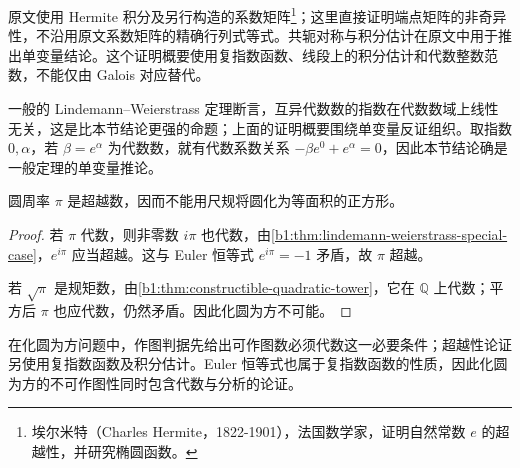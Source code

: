 \begin{proofsketch}
	原文\cite[\S 1, pp. 214--216]{Lindemann1882Pi}使用 Hermite 积分及另行构造的系数矩阵\footnote{埃尔米特（Charles Hermite，1822-1901），法国数学家，证明自然常数 \(e\) 的超越性，并研究椭圆函数。}；这里直接证明端点矩阵的非奇异性，不沿用原文系数矩阵的精确行列式等式。共轭对称与积分估计在原文\cite[\S\S 2--4, pp. 216--225]{Lindemann1882Pi}中用于推出单变量结论。这个证明概要使用复指数函数、线段上的积分估计和代数整数范数，不能仅由 Galois 对应替代。
\end{proofsketch}

一般的 Lindemann--Weierstrass 定理断言，互异代数数的指数在代数数域上线性无关，这是比本节结论更强的命题；上面的证明概要围绕单变量反证组织。取指数 \(0,\alpha\)，若 \(\beta=e^\alpha\) 为代数数，就有代数系数关系 \(-\beta e^0+e^\alpha=0\)，因此本节结论确是一般定理的单变量推论。

\begin{corollary}\label{b1:cor:pi-transcendental}
	圆周率 \(\pi\) 是超越数，因而不能用尺规将圆化为等面积的正方形。
\end{corollary}
\begin{proof}
	若 \(\pi\) 代数，则非零数 \(i\pi\) 也代数，由\cref{b1:thm:lindemann-weierstrass-special-case}，\(e^{i\pi}\) 应当超越。这与 Euler 恒等式 \(e^{i\pi}=-1\) 矛盾，故 \(\pi\) 超越。

	若 \(\sqrt\pi\) 是规矩数，由\cref{b1:thm:constructible-quadratic-tower}，它在 \(\mathbb Q\) 上代数；平方后 \(\pi\) 也应代数，仍然矛盾。因此化圆为方不可能。
\end{proof}
在化圆为方问题中，作图判据先给出可作图数必须代数这一必要条件；超越性论证另使用复指数函数及积分估计。Euler 恒等式也属于复指数函数的性质，因此化圆为方的不可作图性同时包含代数与分析的论证。
